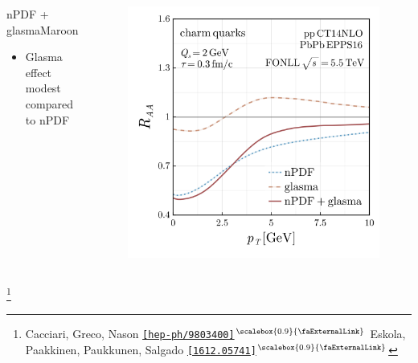 \documentclass[aspectratio=169,11pt,usenames,dvipsnames]{beamer}
\renewcommand{\thefootnote}{}
\newcommand\blfootnote[1]{%
  \begingroup
  \renewcommand\thefootnote{}\footnote{#1}%
  \addtocounter{footnote}{-1}%
  \endgroup
}
\begin{document}
\begin{frame}
\begin{columns}[onlytextwidth,t]
    \begin{center}
        \begin{custombox2}{\normalsize nPDF + glasma}{Maroon}
            \small
            \begin{varwidth}{0.95\textwidth}
            \begin{itemize}\itemsep0em 
                \itemsep0em
                \footnotesize
                \item Glasma effect modest compared to nPDF
            \end{itemize}
            \end{varwidth}
        \end{custombox2}
    \end{center}
    \vspace{-18pt}
    \begin{figure}
        \centering
        \includegraphics[width=0.75\columnwidth]{images/clean_raa_tau_0.3_charm_quark_Qs_2.0_fonll_pdf_vs_npdf_v3.png}
    \end{figure}
    \end{columns}

    \vspace{-20pt}
    \blfootnote{\scriptsize Cacciari, Greco, Nason \href{https://arxiv.org/abs/hep-ph/9803400}{{\color{raablue}\texttt{[hep-ph/9803400]$^\text{\scalebox{0.9}{\faExternalLink}}$}}} Eskola, Paakkinen, Paukkunen, Salgado \href{https://arxiv.org/abs/1612.05741}{{\color{palteal}\texttt{[1612.05741]$^\text{\scalebox{0.9}{\faExternalLink}}$}}}}
\end{frame}
\end{document}
